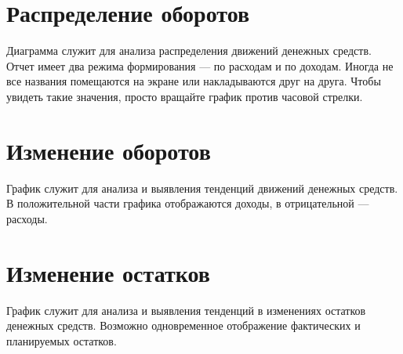 \documentclass[a4paper,10pt,russian]{sphinxmanual}
\begin{document}
\noindent{}
\noindent{}
\noindent{}


\section{Распределение оборотов}
\label{\detokenize{reports:id9}}
\sphinxAtStartPar
Диаграмма служит для анализа распределения движений денежных средств. Отчет имеет два режима формирования —
по расходам и по доходам. Иногда не все названия помещаются на экране или накладываются друг на друга. Чтобы
увидеть такие значения, просто вращайте график против часовой стрелки.


\section{Изменение оборотов}
\label{\detokenize{reports:id10}}
\sphinxAtStartPar
График служит для анализа и выявления тенденций движений денежных средств. В положительной части графика отображаются доходы,
в отрицательной — расходы.


\section{Изменение остатков}
\label{\detokenize{reports:id11}}
\sphinxAtStartPar
График служит для анализа и выявления тенденций в изменениях остатков денежных средств. Возможно одновременное отображение
фактических и планируемых остатков.

\noindent{}

\sphinxstepscope
\end{document}
